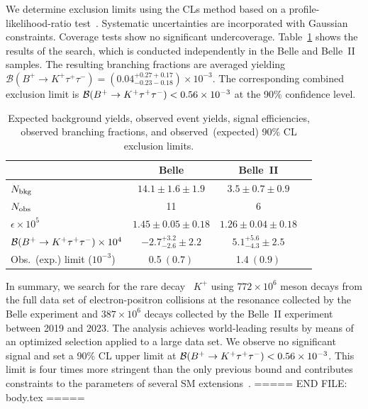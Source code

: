 We determine exclusion limits using the CLs method based on a profile-likelihood-ratio test~\cite{Junk:1999, A_L_Read_2002}. Systematic uncertainties are incorporated with Gaussian constraints. Coverage tests show no significant undercoverage. Table~\ref{table1} shows the results of the search, which is conducted independently in the Belle and Belle~II samples. The resulting branching fractions are averaged yielding $\mathcal{B}(B^+ \to K^+\tau^+\tau^-)= (0.04^{+0.27 +0.17}_{-0.23 -0.18}) \times 10^{-3}$. The corresponding combined exclusion limit is \mbox{$\BR(\Bp\to K^{+}\tautau) < 0.56 \times 10^{-3}$} at the 90\% confidence level.

\begin{table}
\begin{center}
\begin{tabular}{lccc}
\hline
\hline
 & Belle & Belle~II \\ \hline
$N_{\rm bkg}$   & $14.1 \pm 1.6 \pm 1.9$ & $3.5 \pm 0.7 \pm 0.9$  \\
$N_{\rm obs}$     & 11 & 6 \\
$\epsilon \times 10^{5}$ & $1.45 \pm 0.05 \pm 0.18$ & $1.26 \pm 0.04 \pm 0.18$\\
${\cal B} (B^+ \to K^+\tau^+\tau^-)\times 10^{4}$ & $-2.7^{+3.2}_{-2.6}\pm {2.2}$ & $5.1^{+5.6}_{-4.3}\pm {2.5}$\\


Obs.~(exp.) limit ($10^{-3}$)& 0.5$~(0.7)$ & 1.4$~(0.9)$ \\



\hline
\hline
\end{tabular}
\caption{Expected background yields, observed event yields, signal efficiencies, observed branching fractions, and observed~(expected) 90\% CL exclusion limits.}
\label{table1}
\end{center}
\end{table}

In summary, we search for the rare decay \mbox{ \Bp\to$K^{+}$\tautau} using $772 \times 10^6$ \FourS meson decays from the full data set of electron-positron collisions at the \FourS resonance collected by the Belle experiment and $387\times 10^6$  \FourS decays collected by the Belle~II experiment between 2019 and 2023. The analysis achieves world-leading results by means of an optimized selection applied to a large data set. We observe no significant signal and set a 90\% CL upper limit at \mbox{$\BR(\Bp\to K^{+}\tautau) < 0.56 \times 10^{-3}$}. This limit is four times more stringent than the only previous bound and contributes constraints to the parameters of several SM extensions~\cite{Alonso:2015sja, Barbieri:2015yvd, Capdevila:2017iqn, Kumar:2018kmr,Allwicher:2023xba}.
===== END FILE: body.tex =====

